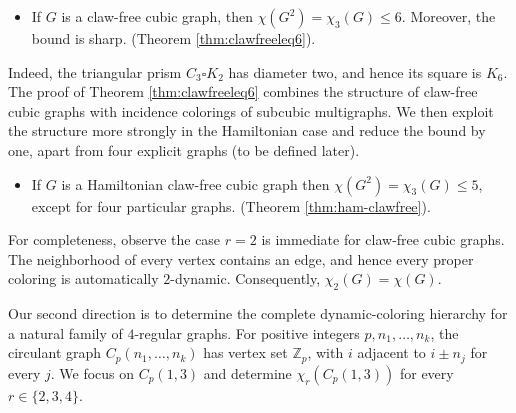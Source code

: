 \documentclass[a4paper,11pt]{article}
\newtheorem{theorem}             {Theorem}
\theoremstyle{case}
\numberwithin{subcase}{case}
\begin{document}
\begin{itemize}
    \item 
If $G$ is a claw-free cubic graph, then
$
\chi(G^2)=\chi_3(G)\le6.
$
Moreover, the bound is sharp. (Theorem \ref{thm:clawfreeleq6}).
\end{itemize}

Indeed, the triangular prism $C_3\square K_2$ has diameter two, and
hence its square is $K_6$.
The proof of Theorem \ref{thm:clawfreeleq6} combines the structure of claw-free cubic
graphs with incidence colorings of subcubic multigraphs. We then exploit
the structure more strongly in the Hamiltonian case and reduce the
bound by one, apart from four explicit graphs (to be defined later).


\begin{itemize}
    \item If $G$ is a Hamiltonian claw-free cubic graph then
$
\chi(G^2)=\chi_3(G)\le5$, except
for four particular graphs. (Theorem \ref{thm:ham-clawfree}).
\end{itemize}

For completeness, observe the case $r=2$ is immediate for claw-free cubic graphs. The neighborhood of every vertex contains an edge, and hence
every proper coloring is automatically $2$-dynamic. Consequently,
$
\chi_2(G)=\chi(G).
$

Our second direction is to determine the complete dynamic-coloring
hierarchy for a natural family of $4$-regular graphs. For positive
integers $p,n_1,\ldots,n_k$, the circulant graph
$C_p(n_1,\ldots,n_k)$ has vertex set $\mathbb Z_p$, with $i$ adjacent
to $i\pm n_j$ for every $j$. We focus on $C_p(1,3)$ and determine
$\chi_r(C_p(1,3))$ for every $r\in\{2,3,4\}$.
\end{document}
